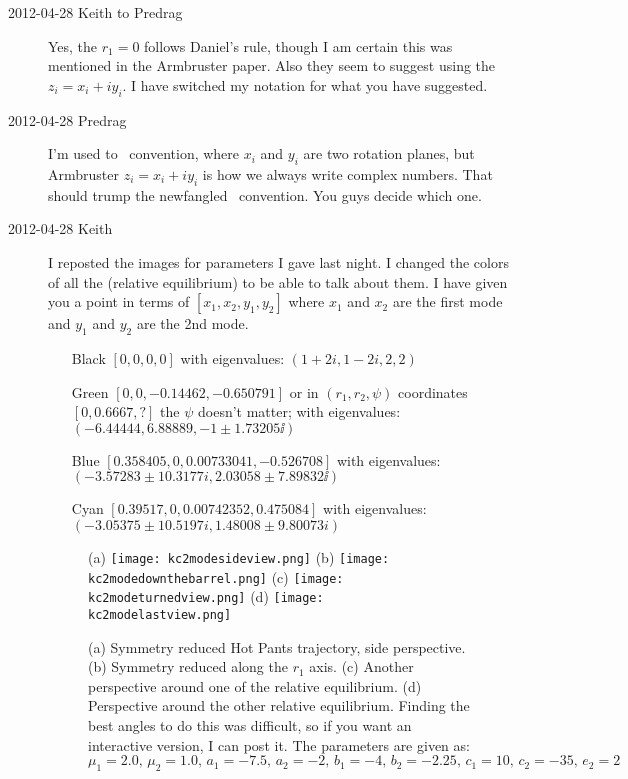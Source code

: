 \begin{description}
\item[2012-04-28 Keith to Predrag] Yes, the $r_1 = 0$ follows Daniel's
rule, though I am certain this was mentioned in the Armbruster paper.
Also they seem to suggest using the $z_i = x_i + i y_i$.  I have switched
my notation for what you have suggested.

\item[2012-04-28 Predrag]
I'm used to \cLe\ convention, where $x_i$ and $y_i$ are
two rotation planes, but Armbruster $z_i = x_i + i y_i$ is how we always write
complex numbers. That should trump the newfangled \cLe\ convention.
You guys decide which one.

\item[2012-04-28 Keith] I reposted the images for parameters I gave last
night.  I changed the colors of all the (relative equilibrium) to be able
to talk about them.  I have given you a point in terms of $[x_1, x_2,
y_1, y_2]$ where $x_1$ and $x_2$ are the first mode and $y_1$ and $y_2$
are the 2nd mode.
\begin{itemize}
    \item[Black] $[0,0,0,0]$ with eigenvalues: $(1+2i,1-2i,2,2)$
    \item[Green] $[0,0,-0.14462,-0.650791]$ or in $(r_1, r_2, \psi)$
    coordinates $[0, 0.6667, ?]$ the $\psi$ doesn't matter; with eigenvalues:
    $(-6.44444,6.88889,-1 \pm 1.73205\ii)$
    \item[Blue] $[0.358405,0,0.00733041,-0.526708]$
    with eigenvalues: $(-3.57283 \pm 10.3177i,2.03058 \pm 7.89832\ii)$
    \item[Cyan] $[0.39517,0,0.00742352,0.475084]$
    with eigenvalues:  $(-3.05375 \pm 10.5197i,1.48008 \pm 9.80073i)$
\end{itemize}

\begin{figure}[H]
\centering
 (a) \texttt{[image: kc2modesideview.png]}
 (b) \texttt{[image: kc2modedownthebarrel.png]}
 (c) \texttt{[image: kc2modeturnedview.png]}
 (d) \texttt{[image: kc2modelastview.png]}
\caption{
(a) Symmetry reduced Hot Pants trajectory, side perspective.
(b) Symmetry reduced along the $r_1$ axis.
(c) Another perspective around one of the relative equilibrium. (d)
Perspective around the other relative equilibrium.
Finding the best angles to do this was difficult, so if you want an
interactive version, I can post it. The parameters are given as:
    $\mu_1 = 2.0 ,\, \mu_2 = 1.0,\, a_1 = -7.5,\, a_2 = -2,\, b_1 = -4,\,
       b_2 = -2.25,\, c_1 = 10,\, c_2 = -35,\, e_2 = 2$
}
\label{fig:2moderedmultieq}
\end{figure}


\end{description}
